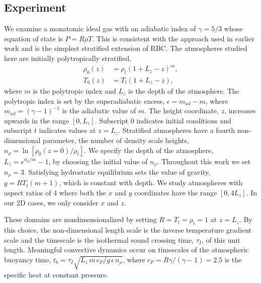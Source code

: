 \subsection{Experiment} 
\label{sec:experiment}
We examine a monatomic ideal gas with an adiabatic index of $\gamma = 5/3$ whose equation of state is $P = R\rho T$. 
This is consistent with the approach used in earlier work \cite{graham1975, chan&all1982, brandenburg&all2005, hurlburt&all1984, cattaneo&all1990, cattaneo&all1991, brummell&all1996}  and is the simplest stratified extension of RBC.
The atmospheres studied here are initially polytropically stratified,
\begin{equation}
\begin{split}
\rho_0(z) &= \rho_{t}(1 + L_z - z)^m, \\
T_0(z)    &= T_{t}(1 + L_z - z),
\label{eqn:polytrope}
\end{split}
\end{equation}
where $m$ is the polytropic index and $L_z$ is the depth of the atmosphere.
The polytropic index is set by the superadiabatic excess, $\epsilon = m_{ad} - m$, where $m_{ad} = (\gamma - 1)^{-1}$ is the adiabatic value of $m$.
The height coordinate, $z$, increases upwards in the range $[0, L_z]$.
Subscript 0 indicates initial conditions and subscript $t$ indicates values at $z = L_z$.   
Stratified atmospheres have a fourth non-dimensional parameter, the number of density scale heights, $n_{\rho} = \ln\left[\rho_0(z=0)/\rho_t\right]$.  
We specify the depth of the atmosphere, $L_z = e^{n_{\rho}/m} - 1$, by choosing the initial value of $n_{\rho}$.
Throughout this work we set $n_{\rho} = 3$.    Satisfying hydrostatic equilibrium sets the value of gravity, $g = RT_t (m + 1)$, which is constant with depth.  
We study atmospheres with aspect ratios of 4 where both the $x$ and $y$ coordinates have the range $[0, 4L_z]$.
In our 2D cases, we only consider $x$ and $z$.

These domains are nondimensionalized by setting $R = T_t = \rho_t = 1$ at $z = L_z$.
By this choice, the non-dimensional length scale is the inverse temperature gradient scale and the timescale is the isothermal sound crossing time, $\tau_I$, of this unit length.
Meaningful convective dynamics occur on timescales of the atmospheric buoyancy time, $t_b = \tau_I \sqrt{L_z\,m\,c_P/g\,\epsilon\,n_\rho}$, where $c_P = R \gamma/(\gamma-1) = 2.5$ is the specific heat at constant pressure.

